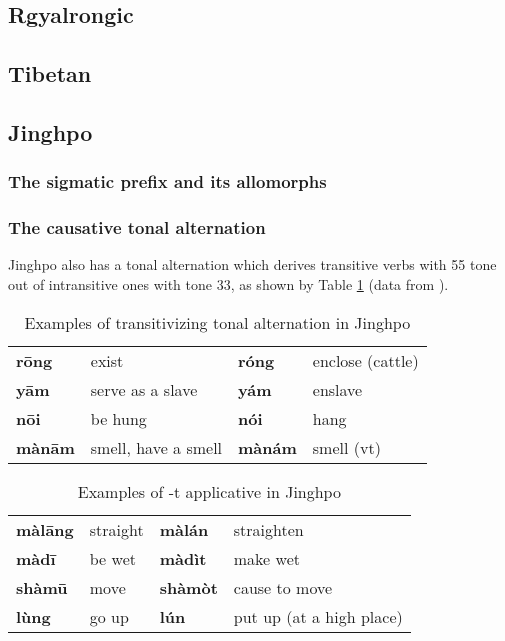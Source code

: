 \documentclass[oneside,a4paper,11pt]{article}
\newcommand{\ipa}[1]{\textbf{{\phon\mbox{#1}}}} %
\begin{document}
\subsection{Rgyalrongic}
\subsection{Tibetan}
\subsection{Jinghpo}

\subsubsection{The sigmatic prefix and its allomorphs}
\subsubsection{The causative tonal alternation}
Jinghpo also has a tonal alternation which derives transitive verbs with 55 tone out of intransitive ones with tone 33, as shown by Table \ref{tab:jinghpo.tone} (data from  \citet[78]{dai92yufa}).

\begin{table}
\caption{Examples of transitivizing tonal alternation in Jinghpo} \label{tab:jinghpo.tone} \centering
\begin{tabular}{llll}
\toprule
\ipa{rōng} &exist &\ipa{róng} &enclose (cattle) \\
\ipa{yām} &serve as a slave &\ipa{yám} &enslave \\
\ipa{nōi} &be hung &\ipa{nói} &hang \\
\ipa{mànām} &smell, have a smell &\ipa{mànám} &smell (vt) \\
\bottomrule
\end{tabular}
\end{table}
 
 
 \begin{table}
\caption{Examples of -t applicative in Jinghpo} \label{tab:jinghpo.appl} \centering
\begin{tabular}{llll}
\toprule
\ipa{màlāng} &straight &\ipa{màlán} &straighten \\
\ipa{màdī} &be wet &\ipa{màdìt} &make wet \\
\ipa{shàmū} &move &\ipa{shàmòt} &cause to move \\
\ipa{lùng} &go up&\ipa{lún} &put up (at a high place) \\
\bottomrule
\end{tabular}
\end{table}
 
\end{document}
